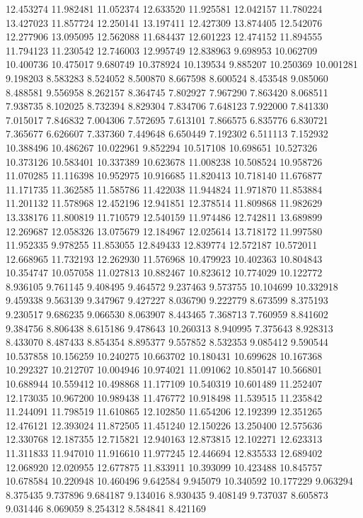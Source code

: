 12.453274
11.982481
11.052374
12.633520
11.925581
12.042157
11.780224
13.427023
11.857724
12.250141
13.197411
12.427309
13.874405
12.542076
12.277906
13.095095
12.562088
11.684437
12.601223
12.474152
11.894555
11.794123
11.230542
12.746003
12.995749
12.838963
9.698953
10.062709
10.400736
10.475017
9.680749
10.378924
10.139534
9.885207
10.250369
10.001281
9.198203
8.583283
8.524052
8.500870
8.667598
8.600524
8.453548
9.085060
8.488581
9.556958
8.262157
8.364745
7.802927
7.967290
7.863420
8.068511
7.938735
8.102025
8.732394
8.829304
7.834706
7.648123
7.922000
7.841330
7.015017
7.846832
7.004306
7.572695
7.613101
7.866575
6.835776
6.830721
7.365677
6.626607
7.337360
7.449648
6.650449
7.192302
6.511113
7.152932
10.388496
10.486267
10.022961
9.852294
10.517108
10.698651
10.527326
10.373126
10.583401
10.337389
10.623678
11.008238
10.508524
10.958726
11.070285
11.116398
10.952975
10.916685
11.820413
10.718140
11.676877
11.171735
11.362585
11.585786
11.422038
11.944824
11.971870
11.853884
11.201132
11.578968
12.452196
12.941851
12.378514
11.809868
11.982629
13.338176
11.800819
11.710579
12.540159
11.974486
12.742811
13.689899
12.269687
12.058326
13.075679
12.184967
12.025614
13.718172
11.997580
11.952335
9.978255
11.853055
12.849433
12.839774
12.572187
10.572011
12.668965
11.732193
12.262930
11.576968
10.479923
10.402363
10.804843
10.354747
10.057058
11.027813
10.882467
10.823612
10.774029
10.122772
8.936105
9.761145
9.408495
9.464572
9.237463
9.573755
10.104699
10.332918
9.459338
9.563139
9.347967
9.427227
8.036790
9.222779
8.673599
8.375193
9.230517
9.686235
9.066530
8.063907
8.443465
7.368713
7.760959
8.841602
9.384756
8.806438
8.615186
9.478643
10.260313
8.940995
7.375643
8.928313
8.433070
8.487433
8.854354
8.895377
9.557852
8.532353
9.085412
9.590544
10.537858
10.156259
10.240275
10.663702
10.180431
10.699628
10.167368
10.292327
10.212707
10.004946
10.974021
11.091062
10.850147
10.566801
10.688944
10.559412
10.498868
11.177109
10.540319
10.601489
11.252407
12.173035
10.967200
10.989438
11.476772
10.918498
11.539515
11.235842
11.244091
11.798519
11.610865
12.102850
11.654206
12.192399
12.351265
12.476121
12.393024
11.872505
11.451240
12.150226
13.250400
12.575636
12.330768
12.187355
12.715821
12.940163
12.873815
12.102271
12.623313
11.311833
11.947010
11.916610
11.977245
12.446694
12.835533
12.689402
12.068920
12.020955
12.677875
11.833911
10.393099
10.423488
10.845757
10.678584
10.220948
10.460496
9.642584
9.945079
10.340592
10.177229
9.063294
8.375435
9.737896
9.684187
9.134016
8.930435
9.408149
9.737037
8.605873
9.031446
8.069059
8.254312
8.584841
8.421169
